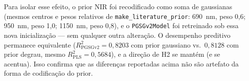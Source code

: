 Para isolar esse efeito, o prior NIR foi recodificado como soma de gaussianas (mesmos centros e pesos relativos de \texttt{make\_literature\_prior}: 690~nm, peso 0,6; 950~nm, peso 1,0; 1150~nm, peso 0,8), e o \texttt{PGSGv2Model} foi retreinado sob essa nova inicialização --- sem qualquer outra alteração. O desempenho preditivo permanece equivalente ($R^2_{\text{PGSGv2}}=0{,}8203$ com prior gaussiano vs.\ $0{,}8128$ com prior degrau, mesmo $R^2_{\text{PLS}}=0{,}5684$), e a direção de H2 se mantém (e se acentua). Isso confirma que as diferenças reportadas acima não são artefato da forma de codificação do prior.

